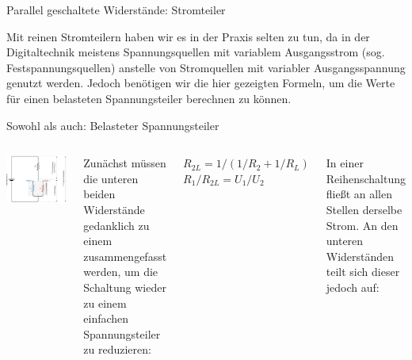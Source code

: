 {\begin{frame}{Parallel geschaltete Widerstände: Stromteiler}
    \bigskip

    \parbox{\linewidth}{
        \footnotesize
        Mit reinen Stromteilern haben wir es in der Praxis selten zu tun, da in der
        Digitaltechnik meistens Spannungsquellen mit variablem Ausgangsstrom (sog.
        Festspannungsquellen) anstelle von Stromquellen mit variabler Ausgangsspannung
        genutzt werden. Jedoch benötigen wir die hier gezeigten Formeln, um die Werte
        für einen belasteten Spannungsteiler berechnen zu können.
    }
\end{frame}
}

{
\small

\begin{frame}{Sowohl als auch: Belasteter Spannungsteiler}
    \begin{columns}
        \includegraphics[width=.9\textwidth]{2-hardwaredesign/img/spannungsteiler_belastet}

        \footnotesize
        \parbox{\textwidth}{
            Zunächst müssen die unteren beiden Widerstände gedanklich zu einem
            zusammengefasst werden, um die Schaltung wieder zu einem einfachen
            Spannungsteiler zu reduzieren:
        }

        \bigskip

        $R_{2L} = 1 / (1/R_2 + 1/R_L)$ \\
        \smallskip
        $R_1 / R_{2L} = U_1 / U_2$ \\

        \bigskip

        \parbox{\textwidth}{
            In einer Reihenschaltung fließt an allen Stellen derselbe Strom. An
            den unteren Widerständen teilt sich dieser jedoch auf:
        }


\end{columns}
\end{frame}}
